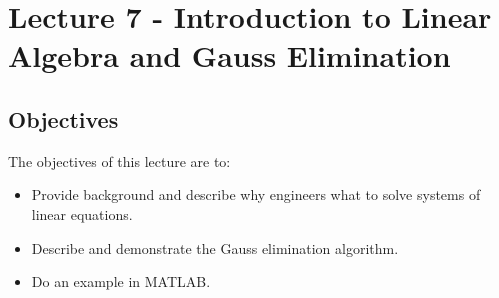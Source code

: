 \chapter{Lecture 7 - Introduction to Linear Algebra and Gauss Elimination}
\label{ch:lec7n}
\section{Objectives}
The objectives of this lecture are to:
\begin{itemize}
\item Provide background and describe why engineers what to solve systems of linear equations.
\item Describe and demonstrate the Gauss elimination algorithm.
\item Do an example in MATLAB.
\end{itemize}
\setcounter{lstannotation}{0}
